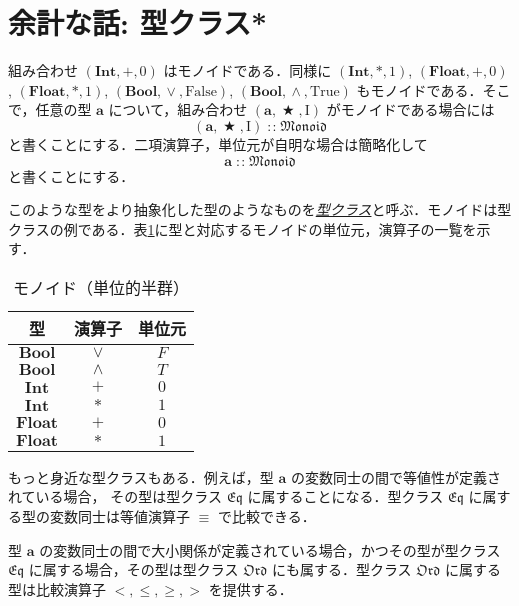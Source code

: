 \documentclass[a4paper,draft]{jsbook}
\newcommand{\keyword}[1]{{\underline{\emph{#1}}}}
\newcommand{\mSpecialConst}[1]{\mathrm{#1}} %
\newcommand{\mTrue}{\mSpecialConst{True}}
\newcommand{\mFalse}{\mSpecialConst{False}}
\newcommand{\mOne}{\mSpecialConst{I}}
\newcommand{\mType}[1]{\mathbf{#1}}
\newcommand{\mBoolType}{\mType{Bool}}
\newcommand{\mIntType}{\mType{Int}}
\newcommand{\mFloatType}{\mType{Float}}
\newcommand{\mSpecialTypeClass}[1]{\mathfrak{#1}} %
\newcommand{\mEqTypeClass}{\mSpecialTypeClass{Eq}}
\newcommand{\mOrdTypeClass}{\mSpecialTypeClass{Ord}}
\newcommand{\mMonoidTypeClass}{\mSpecialTypeClass{Monoid}}
\newcommand{\mTupleOf}[1]{\left(#1\right)}
\DeclareMathOperator{\mIn}{{:\!:}}
\DeclareMathOperator{\mBinOp}{\bigstar}
\DeclareMathOperator{\mLogicalAnd}{\wedge}
\DeclareMathOperator{\mLogicalOr}{\vee}
\begin{document}
\section{余計な話: 型クラス*}

組み合わせ $\mTupleOf{\mIntType,+,0}$ はモノイドである．同様に $\mTupleOf{\mIntType,*,1}$, $\mTupleOf{\mFloatType,+,0}$, $\mTupleOf{\mFloatType,*,1}$, $\mTupleOf{\mBoolType,\mLogicalOr,\mFalse}$, $\mTupleOf{\mBoolType,\mLogicalAnd,\mTrue}$ もモノイドである．そこで，任意の型 $\mType{a}$ について，組み合わせ $\mTupleOf{\mType{a},\mBinOp,\mOne}$ がモノイドである場合には
\begin{equation}
\mTupleOf{\mType{a},\mBinOp,\mOne}\mIn\mMonoidTypeClass
\end{equation}
と書くことにする．二項演算子，単位元が自明な場合は簡略化して
\begin{equation}
\mType{a}\mIn\mMonoidTypeClass
\end{equation}
と書くことにする．

このような型をより抽象化した型のようなものを\keyword{型クラス}と呼ぶ．モノイドは型クラスの例である．表\ref{tab:monoids}に型と対応するモノイドの単位元，演算子の一覧を示す．

\begin{table}
\caption{モノイド（単位的半群）}
\label{tab:monoids}
\begin{center}
\begin{tabular}{||c||c|c||}
\hline
型
    &演算子
    &単位元\\
\hline\hline
$\mBoolType$
    &$\vee$
    &$F$\\
\hline
$\mBoolType$
    &$\wedge$
    &$T$\\
\hline
$\mIntType$
    &$+$
    &$0$\\
\hline
$\mIntType$
    &$*$
    &$1$\\
\hline
$\mFloatType$
    &$+$
    &$0$\\
\hline
$\mFloatType$
    &$*$
    &$1$\\
\hline
\end{tabular}
\end{center}
\end{table}


もっと身近な型クラスもある．例えば，型 $\mType{a}$ の変数同士の間で等値性が定義されている場合，
その型は型クラス $\mEqTypeClass$ に属することになる．型クラス $\mEqTypeClass$ に属する型の変数同士は等値演算子 $\equiv$ で比較できる．

型 $\mType{a}$ の変数同士の間で大小関係が定義されている場合，かつその型が型クラス $\mEqTypeClass$ に属する場合，その型は型クラス $\mOrdTypeClass$ にも属する．型クラス $\mOrdTypeClass$ に属する型は比較演算子 $<,\le,\ge,>$ を提供する．
\end{document}
